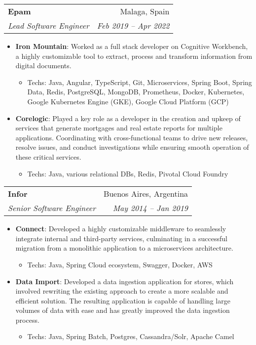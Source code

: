 \documentclass[letterpaper,11pt]{article}
\makeatletter
\newcommand{\resumeItem}[2]{
  \item\small{
    \textbf{#1}{: #2 \vspace{-2pt}}
  }
}
\newcommand{\resumeSubheading}[4]{
  \vspace{2pt}\item
    \begin{tabular*}{0.97\textwidth}[t]{l@{\extracolsep{\fill}}r}
      \textbf{#1} & #2 \\
      \textit{\small#3} & \textit{\small #4} \\
    \end{tabular*}\vspace{-4pt}
}
\newcommand{\resumeItemListStart}{\begin{itemize}[label={}, leftmargin=10pt]}
\newcommand{\resumeItemListEnd}{\end{itemize}\vspace{-5pt}}
\newcommand{\resumeItemDescpritionStart}{\begin{itemize}}
\newcommand{\resumeItemDescpritionEnd}{\end{itemize}}
\makeatother
\begin{document}
    \resumeSubheading    
      {Epam}{Malaga, Spain}
      {Lead Software Engineer}{Feb 2019 -- Apr 2022}
      
      \resumeItemListStart
        \resumeItem
          {Iron Mountain}
          {Worked as a full stack developer on Cognitive Workbench, a highly customizable tool to extract, process and transform information from digital documents.}
           \resumeItemDescpritionStart
             \item Techs: Java, Angular, TypeScript, Git, Microservices, Spring Boot, Spring Data, Redis, PostgreSQL, MongoDB, Prometheus, Docker, Kubernetes, Google Kubernetes Engine (GKE), Google Cloud Platform (GCP) 
           \resumeItemDescpritionEnd
        \resumeItem
          {Corelogic}
          {Played a key role as a developer in the creation and upkeep of services that generate mortgages and real estate reports for multiple applications. Coordinating with cross-functional teams to drive new releases, resolve issues, and conduct investigations while ensuring smooth operation of these critical services.}
           \resumeItemDescpritionStart
             \item Techs: Java, various relational DBs, Redis, Pivotal Cloud Foundry
           \resumeItemDescpritionEnd
      \resumeItemListEnd   
      
    \resumeSubheading
      {Infor}{Buenos Aires, Argentina}
      {Senior Software Engineer}{May 2014 -- Jan 2019}

      \resumeItemListStart
        \resumeItem
          {Connect}
          {Developed a highly customizable middleware to seamlessly integrate internal and third-party services, culminating in a successful migration from a monolithic application to a microservices architecture.}
           \resumeItemDescpritionStart
             \item Techs: Java, Spring Cloud ecosystem, Swagger, Docker, AWS
           \resumeItemDescpritionEnd
        \resumeItem
          {Data Import}
          {Developed a data ingestion application for stores, which involved rewriting the existing approach to create a more scalable and efficient solution. The resulting application is capable of handling large volumes of data with ease and has greatly improved the data ingestion process.}
			\resumeItemDescpritionStart
             \item Techs: Java, Spring Batch, Postgres, Cassandra/Solr, Apache Camel
           \resumeItemDescpritionEnd
      \resumeItemListEnd      
      
\end{document}
